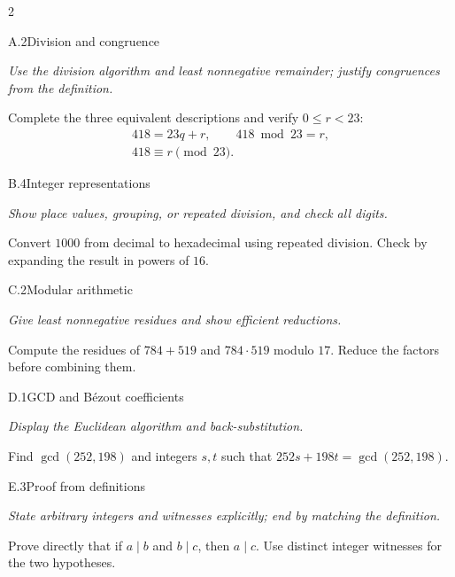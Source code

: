 \documentclass[9pt]{extarticle}
\begin{document}
\begin{multicols}{2}
\begin{CoreProblem}{A.2}{Division and congruence}
{\scriptsize\textit{Use the division algorithm and least nonnegative remainder; justify congruences from the definition.}\par}
Complete the three equivalent descriptions and verify $0\le r<23$:
\[
\begin{gathered}
418=23q+r,\qquad 418\bmod 23=r,\\
418\equiv r\pmod{23}.
\end{gathered}
\]
\end{CoreProblem}
\begin{CoreProblem}{B.4}{Integer representations}
{\scriptsize\textit{Show place values, grouping, or repeated division, and check all digits.}\par}
Convert $1000$ from decimal to hexadecimal using repeated division. Check by
expanding the result in powers of $16$.
\end{CoreProblem}
\begin{CoreProblem}{C.2}{Modular arithmetic}
{\scriptsize\textit{Give least nonnegative residues and show efficient reductions.}\par}
Compute the residues of $784+519$ and $784\cdot519$ modulo $17$. Reduce the
factors before combining them.
\end{CoreProblem}
\columnbreak
\begin{CoreProblem}{D.1}{GCD and B\'ezout coefficients}
{\scriptsize\textit{Display the Euclidean algorithm and back-substitution.}\par}
Find $\gcd(252,198)$ and integers $s,t$ such that
$252s+198t=\gcd(252,198)$.
\end{CoreProblem}
\begin{CoreProblem}{E.3}{Proof from definitions}
{\scriptsize\textit{State arbitrary integers and witnesses explicitly; end by matching the definition.}\par}
Prove directly that if $a\mid b$ and $b\mid c$, then $a\mid c$. Use distinct
integer witnesses for the two hypotheses.
\end{CoreProblem}
\end{multicols}
\CoreWorkArea
\FormBreak
{}
\end{document}

